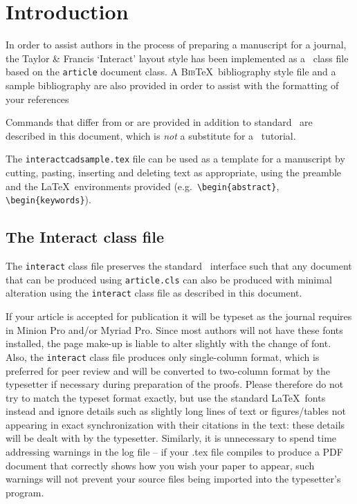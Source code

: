 \documentclass[]{interact}
\theoremstyle{plain}%
\theoremstyle{definition}
\theoremstyle{remark}
\begin{document}
\section{Introduction}

In order to assist authors in the process of preparing a manuscript for a journal, the Taylor \& Francis `\textsf{Interact}' layout style has been implemented as a \LaTeXe\ class file based on the \texttt{article} document class. A \textsc{Bib}\TeX\ bibliography style file and a sample bibliography are also provided in order to assist with the formatting of your references \citep{Alb05}

Commands that differ from or are provided in addition to standard \LaTeXe\ are described in this document, which is \emph{not} a substitute for a \LaTeXe\ tutorial.

The \texttt{interactcadsample.tex} file can be used as a template for a manuscript by cutting, pasting, inserting and deleting text as appropriate, using the preamble and the \LaTeX\ environments provided (e.g.\ \verb"\begin{abstract}", \verb"\begin{keywords}").


\subsection{The \textsf{Interact} class file}\label{class}

The \texttt{interact} class file preserves the standard \LaTeXe\ interface such that any document that can be produced using \texttt{article.cls} can also be produced with minimal alteration using the \texttt{interact} class file as described in this document.

If your article is accepted for publication it will be typeset as the journal requires in Minion Pro and/or Myriad Pro. Since most authors will not have these fonts installed, the page make-up is liable to alter slightly with the change of font. Also, the \texttt{interact} class file produces only single-column format, which is preferred for peer review and will be converted to two-column format by the typesetter if necessary during preparation of the proofs. Please therefore do not try to match the typeset format exactly, but use the standard \LaTeX\ fonts instead and ignore details such as slightly long lines of text or figures/tables not appearing in exact synchronization with their citations in the text: these details will be dealt with by the typesetter. Similarly, it is unnecessary to spend time addressing warnings in the log file -- if your .tex file compiles to produce a PDF document that correctly shows how you wish your paper to appear, such warnings will not prevent your source files being imported into the typesetter's program.
\end{document}
